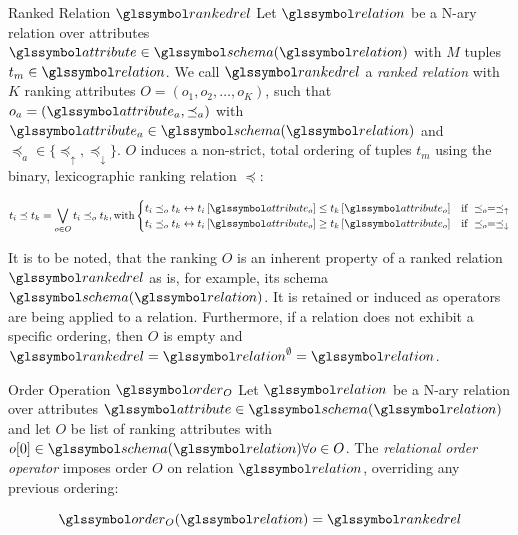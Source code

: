 \begin{definition}[label=definition:ranked_relation]{Ranked Relation $\rankedrel$}{}
Let $\relation$ be a N-ary relation over attributes $\attribute \in \schema (\relation)$ with $M$ tuples $t_m \in \relation$. We call $\rankedrel$ a \emph{ranked relation} with $K$ ranking attributes $O = (o_1, o_2, \ldots, o_K)$, such that $o_a = (\attribute_a, \preceq_{a})$ with $\attribute_a \in \schema (\relation)$ and $\preceq_{a} \in \{ \preceq_{\uparrow}, \preceq_{\downarrow} \}$. $O$ induces a non-strict, total ordering of tuples $t_m$ using the binary, lexicographic ranking relation $\preceq$:

\begin{equation*}
    t_i \preceq t_k  = \bigvee_{o \in O} t_i \preceq_{o} t_k, \textrm{with}
    \begin{cases} 
        t_i \preceq_{o} t_k  \leftrightarrow t_i \left[ \attribute_o \right] \leq t_k \left[ \attribute_o \right]
        & \text{if } \preceq_{o} = \preceq_{\uparrow} \\
        t_i \preceq_{o} t_k \leftrightarrow t_i \left[ \attribute_o \right] \geq t_k \left[ \attribute_o \right]
        & \text{if } \preceq_{o} = \preceq_{\downarrow} \\
    \end{cases}
\end{equation*}

It is to be noted, that the ranking $O$ is an inherent property of a ranked relation $\rankedrel$ as is, for example, its schema $\schema(\relation)$. It is retained or induced as operators are being applied to a relation. Furthermore, if a relation does not exhibit a specific ordering, then $O$ is empty and $\rankedrel = \relation^{\emptyset} = \relation$.
\end{definition}

\begin{definition}[label=definition:rel_alg_order]{Order Operation $\order_{O}$}{}
    Let $\relation$ be a N-ary relation over attributes $\attribute \in \schema (\relation)$ and let $O$ be list of ranking attributes with $o[0] \in \schema (\relation) \forall o \in O$. The  \emph{relational order operator} imposes order $O$ on relation $\relation$, overriding any previous ordering:

    \begin{equation*}
        \order_{O}(\relation) = \rankedrel
    \end{equation*}
\end{definition}

